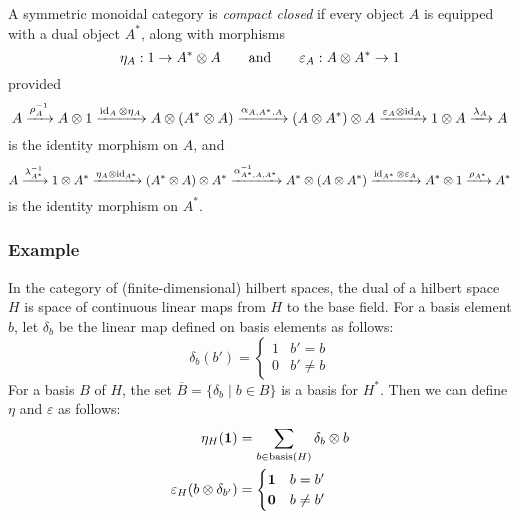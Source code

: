 \begin{definition}
A symmetric monoidal category is \emph{compact closed} if every object $A$ is
equipped with a dual object $A^*$, along with morphisms
\[ \eta_A : 1 \rightarrow A^* \otimes A \qquad\text{and}\qquad
   \varepsilon_A : A \otimes A^* \rightarrow 1 \]
provided
\[
    A \xrightarrow{\rho_A^{-1}} A \otimes 1
    \xrightarrow{\operatorname{id}_A \otimes \eta_A} A\otimes(A^* \otimes A)
    \xrightarrow{\alpha_{A,A^*,A}} (A \otimes A^*)\otimes A
    \xrightarrow{\varepsilon_A \otimes \operatorname{id}_A} 1 \otimes A
    \xrightarrow{\lambda_A} A
\]
is the identity morphism on $A$, and
\[
    A \xrightarrow{\lambda_{A^*}^{-1}} 1 \otimes A^*
    \xrightarrow{\eta_A \otimes \operatorname{id}_{A^*}} (A^* \otimes A) \otimes A^*
    \xrightarrow{\alpha_{A^*,A,A^*}^{-1}} A^* \otimes (A \otimes A^*) 
    \xrightarrow{\operatorname{id}_{A^*} \otimes \varepsilon_A} A^* \otimes 1
    \xrightarrow{\rho_{A^*}} A^*
\]
is the identity morphism on $A^*$.
\end{definition}

\subsubsection*{Example} In the category of (finite-dimensional) hilbert spaces, the dual
of a hilbert space $H$ is space of continuous linear maps from $H$
to the base field. For a basis element $b$, let $\delta_b$
be the linear map defined on basis elements as follows:
\[ \delta_b(b') = \begin{cases}
    1 &b'=b \\
    0 &b' \neq b
\end{cases}\]
For a basis $B$ of $H$, the set $\overline{B} = \{\delta_b \mid b \in B\}$
is a basis for $H^*$. Then we can define $\eta$ and $\varepsilon$ as follows:
\begin{align*}
    \eta_H(\mathbf{1}) &= \sum_{b \in \operatorname{basis}(H)} \delta_b \otimes b \\
    \varepsilon_H(b \otimes \delta_{b'}) &= 
        \begin{cases}   
            \mathbf{1} &b = b' \\
            \mathbf{0} &b \neq b'
        \end{cases}
\end{align*}

